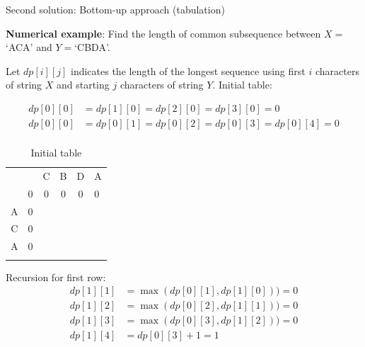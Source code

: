 \documentclass[a4paper,11pt]{book}
\begin{document}
\noindent Second solution: Bottom-up approach (tabulation)

\noindent \textbf{Numerical example}: Find the length of common subsequence between $X=$`ACA' and $Y=$`CBDA'.

\vspace{3mm}

\noindent Let $dp[i][j]$ indicates the length of the longest sequence using first $i$ characters of string $X$ and starting $j$ characters of string $Y$. Initial table:

\begin{align*}
    dp[0][0] &= dp[1][0] = dp[2][0] = dp[3][0] = 0\\
    dp[0][0] &= dp[0][1] = dp[0][2] = dp[0][3] = dp[0][4] = 0\\
\end{align*}
\begin{table}[ht]
\centering
\begin{tabular}{cccccl}
                       &                        & C                      & B                      & D                      & A                      \\ \cline{2-6} 
\multicolumn{1}{c|}{}  & \multicolumn{1}{c|}{0} & \multicolumn{1}{c|}{0} & \multicolumn{1}{c|}{0} & \multicolumn{1}{c|}{0} & \multicolumn{1}{l|}{0} \\ \cline{2-6} 
\multicolumn{1}{c|}{A} & \multicolumn{1}{c|}{0} & \multicolumn{1}{c|}{}  & \multicolumn{1}{c|}{}  & \multicolumn{1}{c|}{}  & \multicolumn{1}{l|}{}  \\ \cline{2-6} 
\multicolumn{1}{c|}{C} & \multicolumn{1}{c|}{0} & \multicolumn{1}{c|}{}  & \multicolumn{1}{c|}{}  & \multicolumn{1}{c|}{}  & \multicolumn{1}{l|}{}  \\ \cline{2-6} 
\multicolumn{1}{c|}{A} & \multicolumn{1}{c|}{0} & \multicolumn{1}{c|}{}  & \multicolumn{1}{c|}{}  & \multicolumn{1}{c|}{}  & \multicolumn{1}{l|}{}  \\ \cline{2-6} 
\multicolumn{1}{l}{}   & \multicolumn{1}{l}{}   & \multicolumn{1}{l}{}   & \multicolumn{1}{l}{}   & \multicolumn{1}{l}{}   &                       
\end{tabular}
\caption*{Initial table}
\end{table}

\noindent Recursion for first row:
\begin{align*}
    dp[1][1] &= \max(dp[0][1], dp[1][0])) = 0\\
    dp[1][2] &= \max(dp[0][2], dp[1][1])) = 0\\
    dp[1][3] &= \max(dp[0][3], dp[1][2])) = 0\\
    dp[1][4] &= dp[0][3] + 1 = 1
\end{align*}
\end{document}
